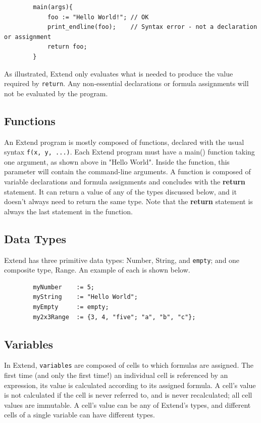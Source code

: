 	\begin{lstlisting}
		main(args){
			foo := "Hello World!"; // OK
			print_endline(foo);    // Syntax error - not a declaration or assignment
			return foo;
		}
	\end{lstlisting}

	\medskip \noindent As illustrated, Extend only evaluates what is needed to produce the value required by \texttt{return}. Any non-essential declarations or formula assignments will not be evaluated by the program.

	\subsection{Functions}
	An Extend program is mostly composed of functions, declared with the usual syntax \texttt{f(x, y, ...)}. Each Extend program must have a main() function taking one argument, as shown above in "Hello World". Inside the function, this parameter will contain the command-line arguments. A function is composed of variable declarations and formula assignments and concludes with the \textbf{return} statement. It can return a value of any of the types discussed below, and it doesn't always need to return the same type.
	Note that the \textbf{return} statement is always the last statement in the function.

	\subsection{Data Types}
	Extend has three primitive data types: Number, String, and \texttt{empty}; and one composite type, Range. An example of each is shown below.

	\begin{lstlisting}
		myNumber    := 5;
		myString    := "Hello World";
		myEmpty     := empty;
		my2x3Range  := {3, 4, "five"; "a", "b", "c"};
	\end{lstlisting}

	\subsection{Variables}
	In Extend, \texttt{variables} are composed of cells to which formulas are assigned. The first time (and only the first time!) an individual cell is referenced by an expression, its value is calculated according to its assigned formula. A cell's value is not calculated if the cell is never referred to, and is never recalculated; all cell values are immutable. A cell's value can be any of Extend's types, and different cells of a single variable can have different types.

